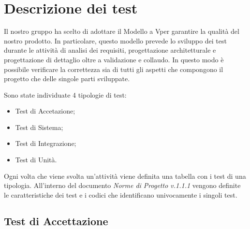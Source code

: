 \section{Descrizione dei test}
Il nostro gruppo ha scelto di adottare il Modello a V\glosp per garantire la qualità del nostro prodotto. In particolare, questo modello prevede lo sviluppo dei test durante le attività di analisi dei requisiti, progettazione architetturale e progettazione di dettaglio oltre a validazione e collaudo.
In questo modo è possibile verificare la correttezza sia di tutti gli aspetti che compongono il progetto che delle singole parti sviluppate.

Sono state individuate 4 tipologie di test:
\begin{itemize}
	\item Test di Accetazione;
	\item Test di Sistema;
	\item Test di Integrazione;
	\item Test di Unità.
\end{itemize}
Ogni volta che viene svolta un'attività viene definita una tabella con i test di una tipologia.
All'interno del documento \textit{Norme di Progetto v.1.1.1} vengono definite le caratteristiche dei test e i codici che identificano univocamente i singoli test.

\subsection{Test di Accettazione}

